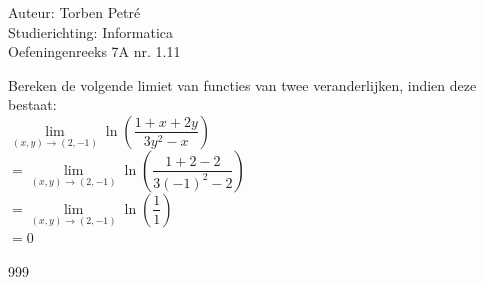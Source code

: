 \documentclass[a4paper]{article}
\newcommand{\liml}{\lim\limits}
\begin{document}
  
\noindent \large Auteur: Torben Petré \\
\noindent \large Studierichting: Informatica\\
\noindent \large Oefeningenreeks 7A nr. 1.11\\

\medskip

\normalsize

Bereken de volgende limiet van functies van twee veranderlijken, indien deze bestaat:\\

$ \liml_{(x,y)\rightarrow(2,-1)} \ln \left( \dfrac{1+x+2y}{3y^2-x} \right) $ \\

$ = \liml_{(x,y)\rightarrow(2,-1)} \ln \left( \dfrac{1+2-2}{3(-1)^2-2} \right) $ \\

$ = \liml_{(x,y)\rightarrow(2,-1)} \ln \left( \dfrac{1}{1} \right) $ \\

$ = 0 $ \\

\begin{thebibliography}{999}
\end{thebibliography}
\end{document}

